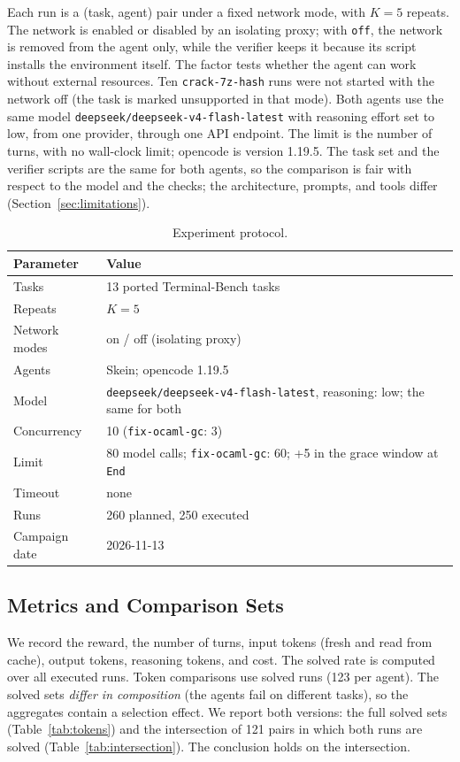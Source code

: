\documentclass[11pt,a4paper]{article}
\begin{document}
Each run is a (task, agent) pair under a fixed network mode, with $K=5$ repeats. The network is
enabled or disabled by an isolating proxy; with \texttt{off}, the network is removed from the
agent only, while the verifier keeps it because its script installs the environment itself. The
factor tests whether the agent can work without external resources. Ten
\texttt{crack-7z-hash} runs were not started with the network off (the task is marked
unsupported in that mode). Both agents use the same model
\texttt{deepseek/deepseek-v4-flash-latest} with reasoning effort set to low, from one provider, through
one API endpoint. The limit is the number of turns, with no wall-clock limit; opencode is
version 1.19.5. The task set and the verifier scripts are the same for both agents, so the
comparison is fair with respect to the model and the checks; the architecture, prompts, and
tools differ (Section~\ref{sec:limitations}).

\begin{table}[t]
\centering
\small
\caption{Experiment protocol.}
\label{tab:protocol}
\begin{tabular}{@{}ll@{}}
\toprule
Parameter & Value \\
\midrule
Tasks & 13 ported Terminal-Bench tasks \\
Repeats & $K=5$ \\
Network modes & on / off (isolating proxy) \\
Agents & Skein; opencode 1.19.5 \\
Model & \texttt{deepseek/deepseek-v4-flash-latest}, reasoning: low; the same for both \\
Concurrency & 10 (\texttt{fix-ocaml-gc}: 3) \\
Limit & 80 model calls; \texttt{fix-ocaml-gc}: 60; +5 in the grace window at \texttt{End} \\
Timeout & none \\
Runs & 260 planned, 250 executed \\
Campaign date & 2026-11-13 \\
\bottomrule
\end{tabular}
\end{table}

\subsection{Metrics and Comparison Sets}

We record the reward, the number of turns, input tokens (fresh and read from cache), output
tokens, reasoning tokens, and cost. The solved rate is computed over all executed runs. Token
comparisons use solved runs (123 per agent). The solved sets \emph{differ in composition} (the
agents fail on different tasks), so the aggregates contain a selection effect. We report both
versions: the full solved sets (Table~\ref{tab:tokens}) and the intersection of 121 pairs in
which both runs are solved (Table~\ref{tab:intersection}). The conclusion holds on the
intersection.
\end{document}
